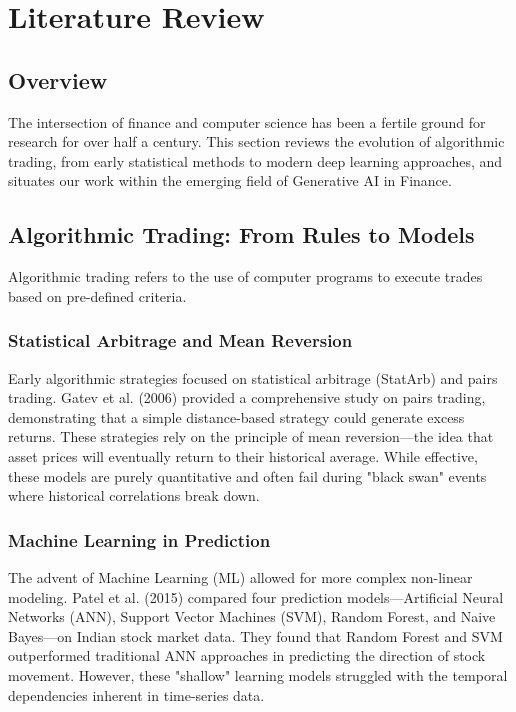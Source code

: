\section{Literature Review}

\subsection{Overview}
The intersection of finance and computer science has been a fertile ground for research for over half a century. This section reviews the evolution of algorithmic trading, from early statistical methods to modern deep learning approaches, and situates our work within the emerging field of Generative AI in Finance.

\subsection{Algorithmic Trading: From Rules to Models}
Algorithmic trading refers to the use of computer programs to execute trades based on pre-defined criteria.
\subsubsection{Statistical Arbitrage and Mean Reversion}
Early algorithmic strategies focused on statistical arbitrage (StatArb) and pairs trading. Gatev et al. (2006) provided a comprehensive study on pairs trading, demonstrating that a simple distance-based strategy could generate excess returns. These strategies rely on the principle of mean reversion—the idea that asset prices will eventually return to their historical average. While effective, these models are purely quantitative and often fail during "black swan" events where historical correlations break down.

\subsubsection{Machine Learning in Prediction}
The advent of Machine Learning (ML) allowed for more complex non-linear modeling. Patel et al. (2015) compared four prediction models—Artificial Neural Networks (ANN), Support Vector Machines (SVM), Random Forest, and Naive Bayes—on Indian stock market data. They found that Random Forest and SVM outperformed traditional ANN approaches in predicting the direction of stock movement. However, these "shallow" learning models struggled with the temporal dependencies inherent in time-series data.

